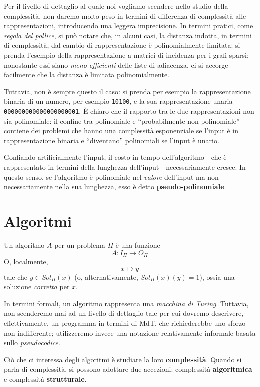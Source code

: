 Per il livello di dettaglio al quale noi vogliamo scendere nello studio della
complessità, non daremo molto peso in termini di differenza di complessità alle
rappresentazioni, introducendo una leggera imprecisione. In termini pratici,
come \textit{regola del pollice}, si può notare che, in alcuni casi, la distanza
indotta, in termini di complessità, dal cambio di rappresentazione è
polinomialmente limitata: si prenda l'esempio della rappresentazione a matrici
di incidenza per i grafi sparsi; nonostante essi siano \textit{meno efficienti}
delle liste di adiacenza, ci si accorge facilmente che la distanza è limitata
polinomialmente.

Tuttavia, non è sempre questo il caso: si prenda per esempio la rappresentazione
binaria di un numero, per esempio \texttt{10100}, e la sua rappresentazione
unaria \texttt{000000000000000000001}. \`E chiaro che il rapporto tra le due
rappresentazioni non sia polinomiale: il confine tra polinomiale e
``probabilmente non polinomiale'' contiene dei problemi che hanno una
complessità esponenziale se l'input è in rappresentazione binaria e
``diventano'' polinomiali se l'input è unario.

Gonfiando artificialmente l'input, il costo in tempo dell'algoritmo - che è
rappresentato in termini della lunghezza dell'input - necessariamente cresce. In
questo senso, se l'algoritmo è polinomiale nel \textit{valore} dell'input ma non
necessariamente nella sua lunghezza, esso è detto \textbf{pseudo-polinomiale}.

\section {Algoritmi}
Un algoritmo $A$ per un problema $\Pi$ è una funzione
$$
	A: I_{\Pi} \rightarrow O_{\Pi}
$$
O, localmente,
$$
	x \mapsto y
$$
tale che  $y \in Sol_{\Pi}(x)$ (o, alternativamente, $Sol_{\Pi}(x)(y) = 1$),
ossia una soluzione \textit{corretta} per $x$.

In termini formali, un algoritmo rappresenta una \textit{macchina di Turing}.
Tuttavia, non scenderemo mai ad un livello di dettaglio tale per cui dovremo
descrivere, effettivamente, un programma in termini di MdT, che richiederebbe
uno sforzo non indifferente; utilizzeremo invece una notazione relativamente
informale basata sullo \textit{pseudocodice}.

Ciò che ci interessa degli algoritmi è studiare la loro \textbf{complessità}.
Quando si parla di complessità, si possono adottare due accezioni:
complessità \textbf{algoritmica} e complessità \textbf{strutturale}.

